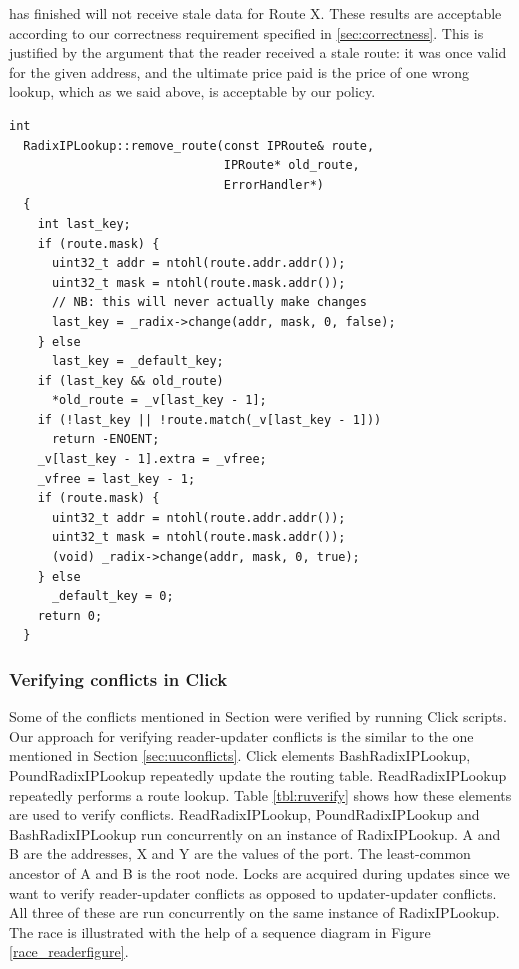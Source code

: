 \documentclass[a4paper]{article}
\begin{document}
has finished will not receive stale data for Route X. These results are acceptable according
to our correctness requirement specified in \ref{sec:correctness}.
This is justified by the argument that the reader received
a stale route: it was once valid for the given address, and the
ultimate price paid is the price of one wrong lookup, which as we said above, is acceptable by our policy.
\begin{lstlisting}[caption= The remove\_route() function, label=removeroute,float=tph]
  int
  RadixIPLookup::remove_route(const IPRoute& route, 
                              IPRoute* old_route, 
                              ErrorHandler*)
  {
    int last_key;
    if (route.mask) {
      uint32_t addr = ntohl(route.addr.addr());
      uint32_t mask = ntohl(route.mask.addr());
      // NB: this will never actually make changes
      last_key = _radix->change(addr, mask, 0, false);
    } else
      last_key = _default_key;
    if (last_key && old_route)
      *old_route = _v[last_key - 1];
    if (!last_key || !route.match(_v[last_key - 1]))
      return -ENOENT;
    _v[last_key - 1].extra = _vfree;
    _vfree = last_key - 1;
    if (route.mask) {
      uint32_t addr = ntohl(route.addr.addr());
      uint32_t mask = ntohl(route.mask.addr());
      (void) _radix->change(addr, mask, 0, true);
    } else
      _default_key = 0;
    return 0;
  }
\end{lstlisting}

\subsubsection{Verifying conflicts in Click}
Some of the conflicts mentioned in Section were verified by running Click scripts. Our approach for verifying reader-updater conflicts is the similar to the one mentioned in Section \ref{sec:uuconflicts}. Click elements BashRadixIPLookup, PoundRadixIPLookup repeatedly update the routing table. ReadRadixIPLookup repeatedly performs a route lookup. Table \ref{tbl:ruverify} shows how these elements are used to verify conflicts. ReadRadixIPLookup, PoundRadixIPLookup and BashRadixIPLookup run concurrently on an instance of RadixIPLookup. A and B are the addresses, X and Y are the values of the port. The least-common ancestor of A and B is the root node. Locks are acquired during updates since we want to verify reader-updater conflicts as opposed to updater-updater conflicts. All three of these are run concurrently on the same instance of RadixIPLookup. The race is illustrated with the help of a sequence diagram in Figure \ref{race_readerfigure}.\\
\end{document}
